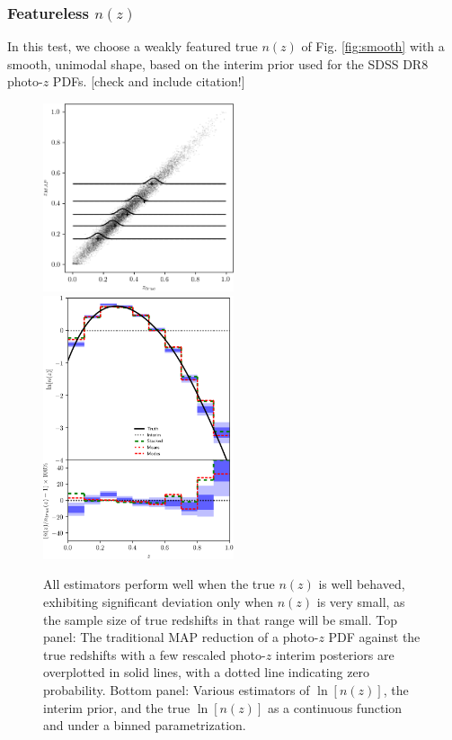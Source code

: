 \documentclass[iop]{emulateapj}
\begin{document}
\subsubsection{Featureless $n(z)$}
\label{sec:smooth}

In this test, we choose a weakly featured true $n(z)$ of Fig. \ref{fig:smooth} 
with a smooth, unimodal shape, based on the interim prior used for the SDSS DR8 
photo-$z$ PDFs.  [check and include citation!]

\begin{figure}
	\begin{center}
		
\includegraphics[width=0.5\textwidth]{fig/smooth_truth/scatter.png}\\
		
\includegraphics[width=0.5\textwidth]{fig/smooth_truth/estimators.png}	
		\caption{All estimators perform well when the true $n(z)$ is 
well behaved, exhibiting significant deviation only when $n(z)$ is very small, 
as the sample size of true redshifts in that range will be small.  Top panel: 
The traditional MAP reduction of a photo-$z$ PDF against the true redshifts 
with a few rescaled photo-$z$ interim posteriors are overplotted in solid 
lines, with a dotted line indicating zero probability.  Bottom panel: Various 
estimators of $\ln[n(z)]$, the interim prior, and the true $\ln[n(z)]$ as a 
continuous function and under a binned parametrization.}
		\label{fig:featured}
	\end{center}
\end{figure}
\end{document}
